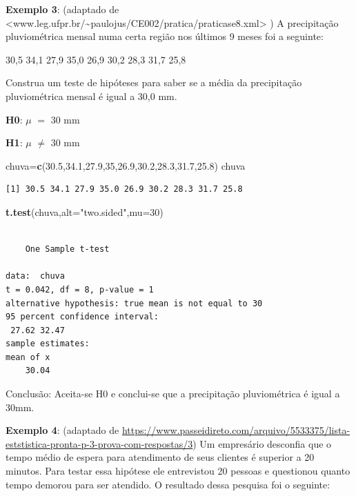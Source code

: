 \documentclass[12pt,brazil,]{book}
\newenvironment{Shaded}{\begin{snugshade}}{\end{snugshade}}
\newcommand{\DataTypeTok}[1]{\textcolor[rgb]{0.13,0.29,0.53}{#1}}
\newcommand{\DecValTok}[1]{\textcolor[rgb]{0.00,0.00,0.81}{#1}}
\newcommand{\FloatTok}[1]{\textcolor[rgb]{0.00,0.00,0.81}{#1}}
\newcommand{\KeywordTok}[1]{\textcolor[rgb]{0.13,0.29,0.53}{\textbf{#1}}}
\newcommand{\NormalTok}[1]{#1}
\newcommand{\StringTok}[1]{\textcolor[rgb]{0.31,0.60,0.02}{#1}}
\begin{document}
\textbf{Exemplo 3}: (adaptado de
\textless{}www.leg.ufpr.br/\textasciitilde{}paulojus/CE002/pratica/praticase8.xml\textgreater{}
) A precipitação pluviométrica mensal numa certa região nos últimos 9
meses foi a seguinte:

30,5 34,1 27,9 35,0 26,9 30,2 28,3 31,7 25,8

Construa um teste de hipóteses para saber se a média da precipitação
pluviométrica mensal é igual a 30,0 mm.

\textbf{H0}: \(\mu\) \(=\) 30 mm

\textbf{H1}: \(\mu\) \(\neq\) 30 mm

\begin{Shaded}
\begin{Highlighting}[]
\NormalTok{chuva=}\KeywordTok{c}\NormalTok{(}\FloatTok{30.5}\NormalTok{,}\FloatTok{34.1}\NormalTok{,}\FloatTok{27.9}\NormalTok{,}\DecValTok{35}\NormalTok{,}\FloatTok{26.9}\NormalTok{,}\FloatTok{30.2}\NormalTok{,}\FloatTok{28.3}\NormalTok{,}\FloatTok{31.7}\NormalTok{,}\FloatTok{25.8}\NormalTok{)}
\NormalTok{chuva}
\end{Highlighting}
\end{Shaded}

\begin{verbatim}
[1] 30.5 34.1 27.9 35.0 26.9 30.2 28.3 31.7 25.8
\end{verbatim}

\begin{Shaded}
\begin{Highlighting}[]
\KeywordTok{t.test}\NormalTok{(chuva,}\DataTypeTok{alt=}\StringTok{"two.sided"}\NormalTok{,}\DataTypeTok{mu=}\DecValTok{30}\NormalTok{)}
\end{Highlighting}
\end{Shaded}

\begin{verbatim}

    One Sample t-test

data:  chuva
t = 0.042, df = 8, p-value = 1
alternative hypothesis: true mean is not equal to 30
95 percent confidence interval:
 27.62 32.47
sample estimates:
mean of x 
    30.04 
\end{verbatim}

Conclusão: Aceita-se H0 e conclui-se que a precipitação pluviométrica é
igual a 30mm.

\textbf{Exemplo 4}: (adaptado de
\url{https://www.passeidireto.com/arquivo/5533375/lista-eststistica-pronta-p-3-prova-com-respostas/3})
Um empresário desconfia que o tempo médio de espera para atendimento de
seus clientes é superior a 20 minutos. Para testar essa hipótese ele
entrevistou 20 pessoas e questionou quanto tempo demorou para ser
atendido. O resultado dessa pesquisa foi o seguinte:
\end{document}
